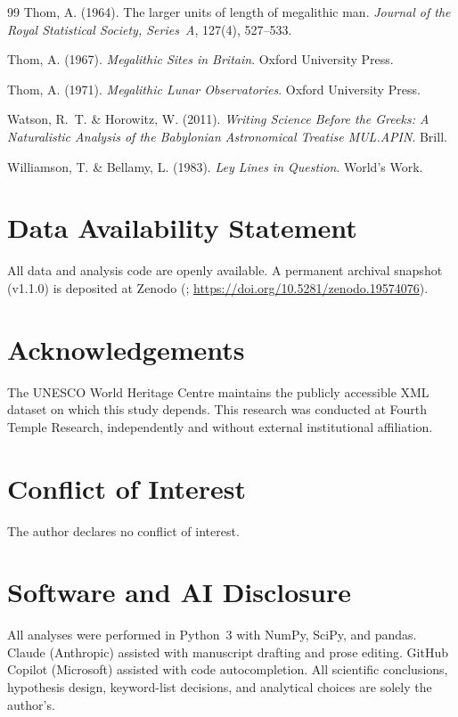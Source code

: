 \documentclass[HARVARD,twocolumn]{USG}
\begin{document}
\begin{thebibliography}{99}
Thom, A. (1964).
The larger units of length of megalithic man.
\textit{Journal of the Royal Statistical Society, Series~A}, 127(4), 527--533.

Thom, A. (1967).
\textit{Megalithic Sites in Britain}.
Oxford University Press.

Thom, A. (1971).
\textit{Megalithic Lunar Observatories}.
Oxford University Press.

Watson, R.~T. \& Horowitz, W. (2011).
\textit{Writing Science Before the Greeks: A Naturalistic Analysis of the
Babylonian Astronomical Treatise MUL.APIN}.
Brill.

Williamson, T. \& Bellamy, L. (1983).
\textit{Ley Lines in Question}.
World's Work.

\end{thebibliography}


\section*{Data Availability Statement}
\label{sec:data_code}
All data and analysis code are openly available. A permanent archival
snapshot (v1.1.0) is deposited at Zenodo
(\citealt{tenenbaum2026audit}; \url{https://doi.org/10.5281/zenodo.19574076}).

\section*{Acknowledgements}
The UNESCO World Heritage Centre maintains the publicly accessible XML
dataset on which this study depends. This research was conducted at Fourth
Temple Research, independently and without external institutional affiliation.

\section*{Conflict of Interest}
The author declares no conflict of interest.

\section*{Software and AI Disclosure}
All analyses were performed in Python~3 with NumPy, SciPy, and pandas.
Claude (Anthropic) assisted with manuscript drafting and prose editing.
GitHub Copilot (Microsoft) assisted with code autocompletion.
All scientific conclusions, hypothesis design, keyword-list decisions,
and analytical choices are solely the author's.
\end{document}
